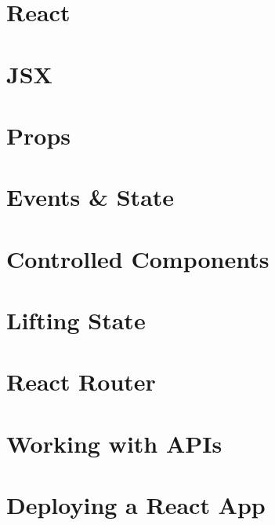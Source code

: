 \documentclass[b5paper,openany]{book}
\begin{document}
\tp


\tableofcontents



\chapter{React}


\chapter{JSX}


\chapter{Props}


\chapter{Events \& State}


\chapter{Controlled Components}


\chapter{Lifting State}


\chapter{React Router}


\chapter{Working with APIs}


\chapter{Deploying a React App}






\end{document}
